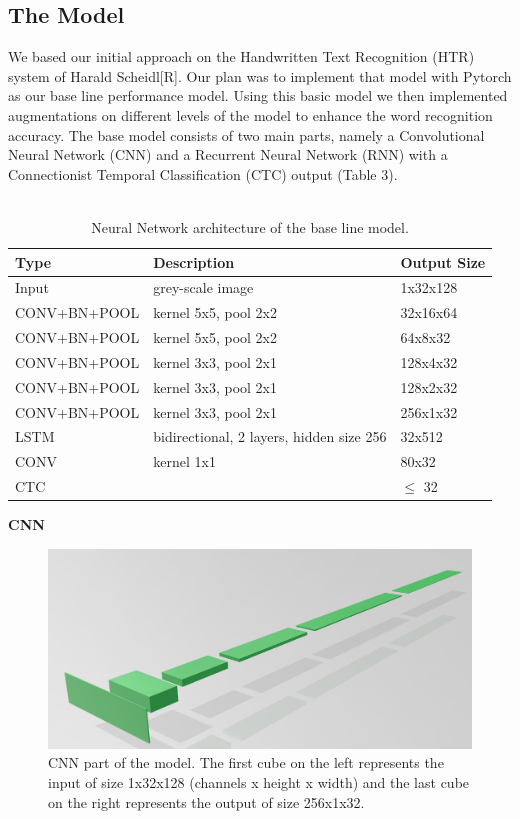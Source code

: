 \documentclass{article}
\begin{document}
\subsection{The Model}
We based our initial approach on the Handwritten Text Recognition (HTR) system of Harald Scheidl[R]. Our plan was to implement that model with Pytorch as our base line performance model. Using this basic model we then implemented augmentations on different levels of the model to enhance the word recognition accuracy. The base model consists of two main parts, namely a Convolutional Neural Network (CNN) and a Recurrent Neural Network (RNN) with a Connectionist Temporal Classification (CTC) output (Table 3).\\\\
\begin{table}[H]
\centering
\begin{tabular}{l|l|l}
Type & Description & Output Size \\ \hline
Input & grey-scale image & 1x32x128 \\ \hline
CONV+BN+POOL & kernel 5x5, pool 2x2 & 32x16x64 \\ \hline
CONV+BN+POOL & kernel 5x5, pool 2x2 & 64x8x32 \\ \hline
CONV+BN+POOL & kernel 3x3, pool 2x1 & 128x4x32 \\ \hline
CONV+BN+POOL & kernel 3x3, pool 2x1 & 128x2x32 \\ \hline
CONV+BN+POOL & kernel 3x3, pool 2x1 & 256x1x32 \\ \hline
LSTM         & bidirectional, 2 layers, hidden size 256 & 32x512 \\ \hline
CONV         & kernel 1x1 & 80x32 \\ \hline
CTC          &      & \(\leqslant\) 32 \\ \hline
\end{tabular}
\caption{Neural Network architecture of the base line model.}
\end{table}
\textbf{CNN}\\
\begin{figure}[H]
\begin{center}
\includegraphics[scale=0.3]{CNN}
\end{center}
\caption{CNN part of the model. The first cube on the left represents the input of size 1x32x128 (channels x height x width) and the last cube on the right represents the output of size 256x1x32.}
\end{figure}
\end{document}
